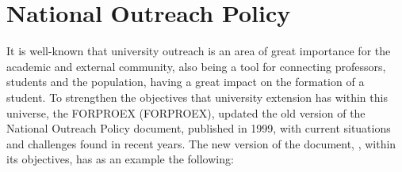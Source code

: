 \section{National Outreach Policy}\label{sec:3.1}

It is well-known that university outreach is an area of great importance for the academic and external community, also being a tool for connecting professors, students and the population, having a great impact on the formation of a student. 
To strengthen the objectives that university extension has within this universe, the \acl{FORPROEX} (\ac{FORPROEX}), updated the old version of the National Outreach Policy document, published in 1999, with current situations and challenges found in recent years.
The new version of the document, \cite{politicaNacional}, within its objectives, has as an example the following:


